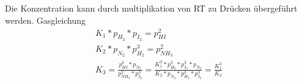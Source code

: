 \documentclass[a4paper]{article}
\begin{document}
\subsection{}
Die Konzentration kann durch multiplikation von RT zu Drücken übergeführt werden. Gasgleichung
\begin{align}
  K_1*p_{H_2}*p_{I_2}=p_{HI}^2 \\
  K_2*p_{N_2}*p_{H_2}^3=p_{NH_3}^2\\
  K_3=\frac{p_{HI}^6*p_{N_2}}{p_{NH_3}^2*p_{I_2}^3}=
  \frac{K_1^3*p_{H_2}^3*p_{I_2}^3*p_{N_2}}{K_2*p_{N_2}*p_{H_2}^3*p_{I_2}^3}=  \frac{K_1^3}{K_2}
\end{align}

\subsection{}
\end{document}
